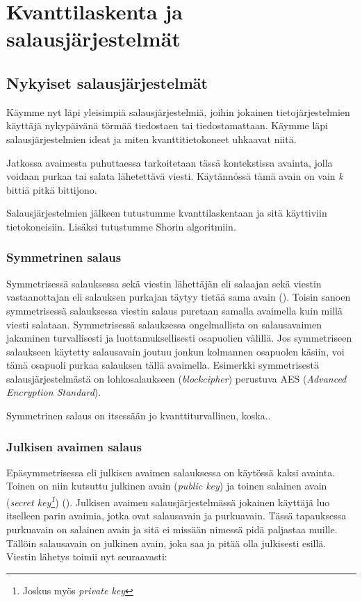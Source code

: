 \chapter{Kvanttilaskenta ja salausjärjestelmät\label{methods}}

\section{Nykyiset salausjärjestelmät}
Käymme nyt läpi yleisimpiä salausjärjestelmiä, joihin jokainen tietojärjestelmien käyttäjä nykypäivänä törmää tiedostaen tai tiedostamattaan. Käymme läpi salausjärjestelmien ideat ja miten kvanttitietokoneet uhkaavat niitä.

Jatkossa avaimesta puhuttaessa tarkoitetaan tässä kontekstissa avainta, jolla voidaan purkaa tai salata lähetettävä viesti. Käytännössä tämä avain on vain \emph{k} bittiä pitkä bittijono.

Salausjärjestelmien jälkeen tutustumme kvanttilaskentaan ja sitä käyttiviin tietokoneisiin. Lisäksi tutustumme Shorin algoritmiin.

\subsection{Symmetrinen salaus}
 Symmetrisessä salauksessa sekä viestin lähettäjän eli salaajan sekä viestin vastaanottajan eli salauksen purkajan täytyy tietää sama avain (\cite{bellare2005introduction}). Toisin sanoen symmetrisessä salauksessa viestin salaus puretaan samalla avaimella kuin millä viesti salataan.  Symmetrisessä salauksessa ongelmallista on salausavaimen jakaminen turvallisesti ja luottamuksellisesti osapuolien välillä. Jos symmetriseen salaukseen käytetty salausavain joutuu jonkun kolmannen osapuolen käsiin, voi tämä osapuoli purkaa salauksen tällä avaimella. Esimerkki symmetrisestä salausjärjestelmästä on lohkosalaukseen (\emph{blockcipher}) perustuva AES (\emph{Advanced Encryption Standard}).
 
 Symmetrinen salaus on itsessään jo kvanttiturvallinen, koska..
 
 \subsection{Julkisen avaimen salaus}
 Epäsymmetrisessa eli julkisen avaimen salauksessa on käytössä kaksi avainta. Toinen on niin kutsuttu julkinen avain (\emph{public key}) ja toinen salainen avain (\emph{secret key\footnote{Joskus myös \emph{private key}}}) (\cite{bellare2005introduction}). Julkisen avaimen salausjärjestelmässä jokainen käyttäjä luo itselleen parin avaimia, jotka ovat salausavain ja purkuavain. Tässä tapauksessa purkuavain on salainen avain ja sitä ei missään nimessä pidä paljastaa muille. Tällöin salausavain on julkinen avain, joka saa ja pitää olla julkisesti esillä. Viestin lähetys toimii nyt seuraavasti:
 
